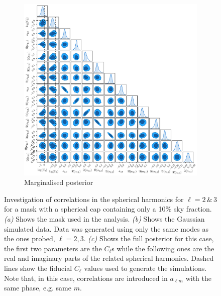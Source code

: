 \begin{figure}
\begin{subfigure}[b]{\textwidth}
 \includegraphics[width=\textwidth]{BPL-FIGS/RandomBand_fsky_01_trianglePlot.pdf}
  \caption{Marginalised posterior}
  \label{fig:BPL:PoleTri}
\end{subfigure}
\caption[Investigation of correlation spherical harmonics for $\ell = 2\, \& \, 3$ for a mask with a spherical cap containing only a 10\% sky fraction]{Investigation of correlations in the spherical harmonics for $\ell = 2\, \& \, 3$ for a mask with a spherical cap containing only a 10\% sky fraction. \textit{(a)} Shows the mask used in the analysis. \textit{(b)} Shows the Gaussian simulated data. Data was generated using only the same modes as the ones probed, $\ell = 2,3$. \textit{(c)} Shows the full posterior for this case, the first two parameters are the $C_{\ell}$s while the following ones are the real and imaginary parts of the related spherical harmonics. Dashed lines show the fiducial $C_{\ell}$ values used to generate the simulations. Note that, in this case, correlations are introduced in $a_{\ell m}$ with the same phase, e.g. same $m$.}
\label{fig:BPL:Pole}
\end{figure}

